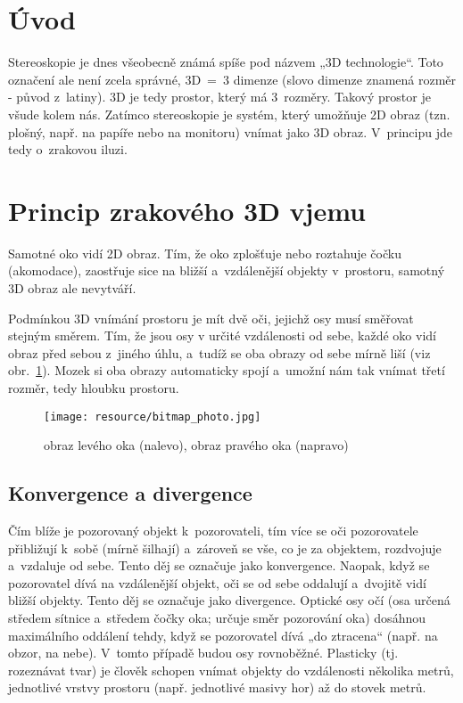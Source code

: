 \documentclass{article}
\begin{document}

\setlength{\parindent}{5ex}

\section*{Úvod}
Stereoskopie\cite{wiki_stereoskopie} je dnes všeobecně známá spíše pod názvem „3D technologie“. Toto označení ale není zcela správné, 3D~=~3 dimenze (slovo dimenze\cite{dimension} znamená rozměr - původ z~latiny). 3D je tedy prostor, který má 3~rozměry. Takový prostor je všude kolem nás. Zatímco stereoskopie je systém, který umožňuje 2D obraz (tzn. plošný, např. na papíře nebo na monitoru) vnímat jako 3D obraz. V~principu jde tedy o~zrakovou iluzi.

\section{Princip zrakového 3D vjemu}
Samotné oko vidí 2D obraz. Tím, že oko zplošťuje nebo roztahuje čočku (akomodace\cite{accommodation}), zaostřuje sice na bližší a~vzdálenější objekty v~prostoru, samotný 3D obraz ale nevytváří.\par
Podmínkou 3D vnímání prostoru je mít dvě oči, jejichž osy musí směřovat stejným směrem. Tím, že jsou osy v určité vzdálenosti od sebe, každé oko vidí obraz před sebou z~jiného úhlu, a~tudíž se oba obrazy od sebe mírně liší (viz obr.~\ref{viewsDiff}). Mozek si oba obrazy automaticky spojí a~umožní nám tak vnímat třetí rozměr, tedy hloubku prostoru.

\begin{figure}[htbp]
        \begin{center}
            \texttt{[image: resource/bitmap\_photo.jpg]}
        \end{center}
        \caption{obraz levého oka (nalevo), obraz pravého oka (napravo)}
        \label{viewsDiff}
    \end{figure}

\subsection{Konvergence a divergence}
Čím blíže je pozorovaný objekt k~pozorovateli, tím více se oči pozorovatele přibližují k~sobě (mírně šilhají) a~zároveň se vše, co je za objektem, rozdvojuje a~vzdaluje od sebe. Tento děj se označuje jako konvergence\cite{convergence}. Naopak, když se pozorovatel dívá na vzdálenější objekt, oči se od sebe oddalují a~dvojitě vidí bližší objekty. Tento děj se označuje jako divergence\cite{divergence}. Optické osy očí (osa určená středem sítnice a~středem čočky oka; určuje směr pozorování oka) dosáhnou maximálního oddálení tehdy, když se pozorovatel dívá „do ztracena“ (např. na obzor, na nebe). V~tomto případě budou osy rovnoběžné. Plasticky (tj. rozeznávat tvar) je člověk schopen vnímat objekty do vzdálenosti několika metrů, jednotlivé vrstvy prostoru (např. jednotlivé masivy hor) až do stovek metrů.
\end{document}
